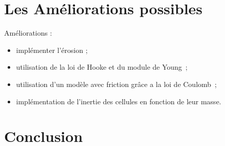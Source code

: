 \documentclass{beamer}
\begin{document}
\section{Les Améliorations possibles}
\begin{frame}
  Améliorations :
  \begin{itemize}
    \item implémenter l'érosion ;
    \item utilisation de la loi de Hooke et du module de Young~;
    \item utilisation d'un modèle avec friction grâce a la loi de Coulomb~;
    \item implémentation de l'inertie des cellules en fonction de leur masse.
  \end{itemize}
\end{frame}

\section{Conclusion}
\begin{frame}
 
\end{frame}
\end{document}
